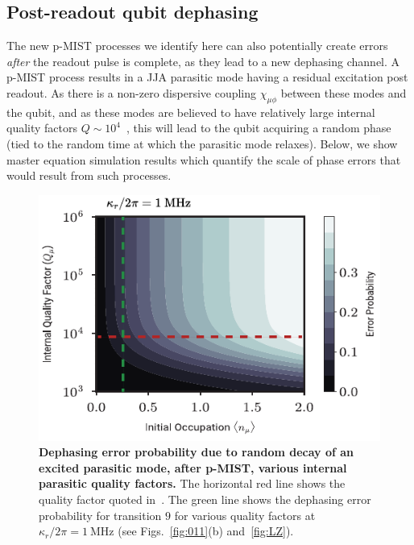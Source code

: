 \documentclass[%
reprint,
superscriptaddress,
 amsmath,amssymb,
 aps,
 prx,
longbibliography,
floatfix,
]{revtex4-2}
\begin{document}
\subsection{Post-readout qubit dephasing}\label{sec:dephasing}

The new p-MIST processes we identify here can also potentially create errors \textit{after} the readout pulse is complete, as they lead to a new dephasing channel.  A p-MIST process results in a JJA parasitic mode having a residual excitation post readout.  As there is a non-zero dispersive coupling 
$\chi_{\mu \phi}$ between these modes and the qubit, and as these modes are believed to have relatively large internal quality factors $Q\sim 10^{4}$~\cite{masluk_microwave_2012, masluk2013reducing}, this will lead to the qubit acquiring a random phase (tied to the random time at which the parasitic mode relaxes).  Below, we show master equation simulation results which quantify the
scale of phase errors that would result from such processes. 

\begin{figure}[htb]
    \centering
    \includegraphics[width=\linewidth]{Figures/dephasing.pdf}
    \caption{{\bf Dephasing error probability due to random decay of an excited parasitic mode, after p-MIST, various internal parasitic quality factors.} The horizontal red line shows the quality factor quoted in~\cite{masluk_microwave_2012}. The green line shows the dephasing error probability for transition $9$ for various quality factors at $\kappa_r/2\pi=1 \ \mathrm{MHz}$ (see Figs.~\ref{fig:011}(b) and~\ref{fig:LZ}).}
    \label{fig:dephasing}
\end{figure}
\end{document}
